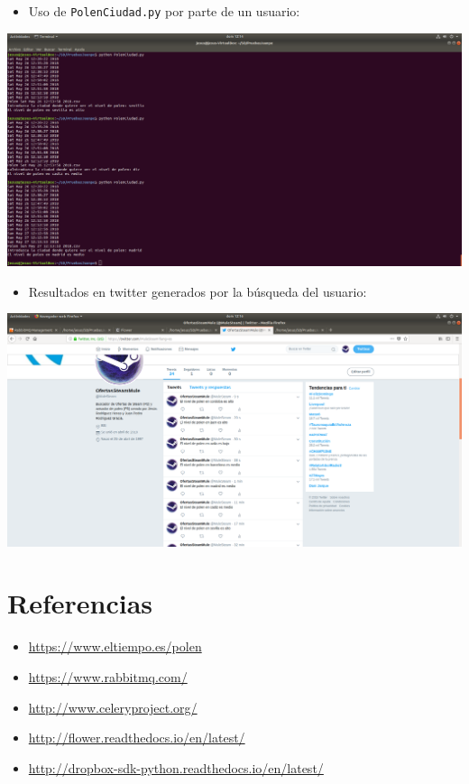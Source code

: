 \documentclass[12pt,letterpaper]{article}
\begin{document}
\newpage
\begin{itemize}
	\item Uso de \texttt{PolenCiudad.py} por parte de un usuario:
\end{itemize}
\begin{center}
	\includegraphics[scale=0.24]{6.png}
\end{center}

\begin{itemize}
	\item Resultados en twitter generados por la búsqueda del usuario:
\end{itemize}
\begin{center}
	\includegraphics[scale=0.24]{7.png}
\end{center}



\section{Referencias}
\begin{itemize}
	\item \url{https://www.eltiempo.es/polen}
	\item \url{https://www.rabbitmq.com/}
	\item \url{http://www.celeryproject.org/}
	\item \url{http://flower.readthedocs.io/en/latest/}
	\item \url{http://dropbox-sdk-python.readthedocs.io/en/latest/}
\end{itemize}
\end{document}
